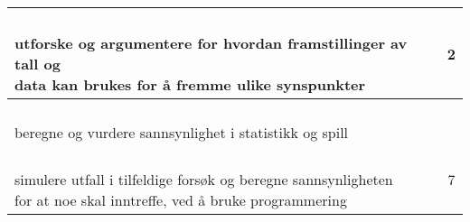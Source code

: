 \documentclass{article}
\begin{document}
\begin{center}
\begin{tabular}{p{10.5cm} | c | c |}
		\shortstack[l]{\\ utforske og argumentere for hvordan framstillinger av tall og \\data kan brukes for å fremme ulike synspunkter
		} &\shortstack{} &\shortstack{2\\{}} \\ \hline
		
		\shortstack[l]{\\ beregne og vurdere sannsynlighet i statistikk og spill
		} &\shortstack{} &\shortstack{5} \\ \hline
		
		\shortstack[l]{\\ simulere utfall i tilfeldige forsøk og beregne sannsynligheten \\for at noe skal inntreffe, ved å bruke programmering
		} &\shortstack{} &\shortstack{7\\{}} \\ \hline	
	\end{tabular}	
\end{center} \vspace{20pt}
\end{document}
